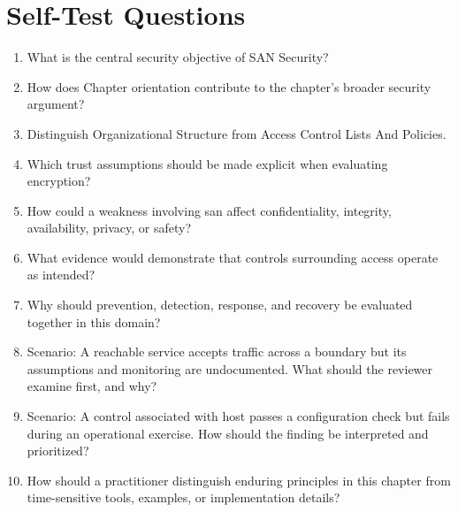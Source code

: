 \documentclass[11pt]{article}
\begin{document}
\section*{Self-Test Questions}
\begin{enumerate}
\item What is the central security objective of SAN Security?
\item How does Chapter orientation contribute to the chapter's broader security argument?
\item Distinguish Organizational Structure from Access Control Lists And Policies.
\item Which trust assumptions should be made explicit when evaluating encryption?
\item How could a weakness involving san affect confidentiality, integrity, availability, privacy, or safety?
\item What evidence would demonstrate that controls surrounding access operate as intended?
\item Why should prevention, detection, response, and recovery be evaluated together in this domain?
\item Scenario: A reachable service accepts traffic across a boundary but its assumptions and monitoring are undocumented. What should the reviewer examine first, and why?
\item Scenario: A control associated with host passes a configuration check but fails during an operational exercise. How should the finding be interpreted and prioritized?
\item How should a practitioner distinguish enduring principles in this chapter from time-sensitive tools, examples, or implementation details?
\end{enumerate}
\end{document}
